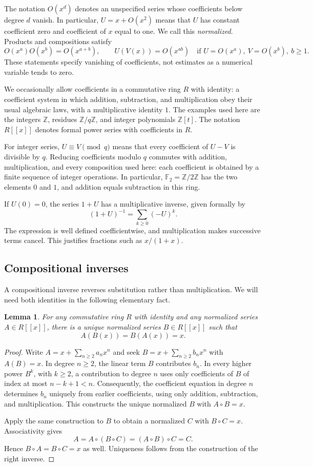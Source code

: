 \documentclass[11pt,a4paper]{article}
\newtheorem{lemma}[theorem]{Lemma}
\theoremstyle{remark}
\newcommand{\Z}{\mathbb Z}
\newcommand{\F}{\mathbb F}
\begin{document}
The notation $O(x^d)$ denotes an unspecified series whose coefficients below
degree $d$ vanish. In particular, $U=x+O(x^2)$ means that $U$ has constant
coefficient zero and coefficient of $x$ equal to one. We call this
\emph{normalized}. Products and compositions satisfy
\[
 O(x^a)O(x^b)=O(x^{a+b}),\qquad
 U(V(x))=O(x^{ab})
 \quad\text{if }U=O(x^a),\ V=O(x^b),\ b\ge1.
\]
These statements specify vanishing of coefficients, not estimates as a
numerical variable tends to zero.

We occasionally allow coefficients in a commutative ring $R$ with identity:
a coefficient system in which addition, subtraction, and multiplication
obey their usual algebraic laws, with a multiplicative identity $1$.
The examples used here are the integers $\Z$, residues $\Z/q\Z$, and
integer polynomials $\Z[t]$. The notation $R[[x]]$ denotes formal power
series with coefficients in $R$.

For integer series, $U\equiv V\pmod q$ means that every coefficient of
$U-V$ is divisible by $q$. Reducing coefficients modulo $q$ commutes with
addition, multiplication, and every composition used here: each coefficient
is obtained by a finite sequence of integer operations. In particular,
$\F_2=\Z/2\Z$ has the two elements $0$ and $1$, and addition equals
subtraction in this ring.

If $U(0)=0$, the series $1+U$ has a multiplicative inverse, given formally by
\[
 (1+U)^{-1}=\sum_{k\ge0}(-U)^k.
\]
The expression is well defined coefficientwise, and multiplication makes
successive terms cancel. This justifies fractions such as $x/(1+x)$.

\subsection{Compositional inverses}

A compositional inverse reverses substitution rather than multiplication.
We will need both identities in the following elementary fact.

\begin{lemma}\label{lem:inverse}
For any commutative ring $R$ with identity and any normalized series
$A\in R[[x]]$, there is a unique normalized series $B\in R[[x]]$ such that
\[
 A(B(x))=B(A(x))=x.
\]
\end{lemma}

\begin{proof}
Write $A=x+\sum_{n\ge2}a_nx^n$ and seek
$B=x+\sum_{n\ge2}b_nx^n$ with $A(B)=x$.
In degree $n\ge2$, the linear term $B$ contributes $b_n$.
In every higher power $B^k$, with $k\ge2$, a contribution to degree $n$
uses only coefficients of $B$ of index at most $n-k+1<n$.
Consequently, the coefficient equation in degree $n$ determines $b_n$
uniquely from earlier coefficients, using only addition, subtraction, and multiplication.
This constructs the unique normalized $B$ with $A\circ B=x$.

Apply the same construction to $B$ to obtain a normalized $C$ with
$B\circ C=x$. Associativity gives
\[
 A=A\circ(B\circ C)=(A\circ B)\circ C=C.
\]
Hence $B\circ A=B\circ C=x$ as well. Uniqueness follows from the
construction of the right inverse.
\end{proof}
\end{document}
